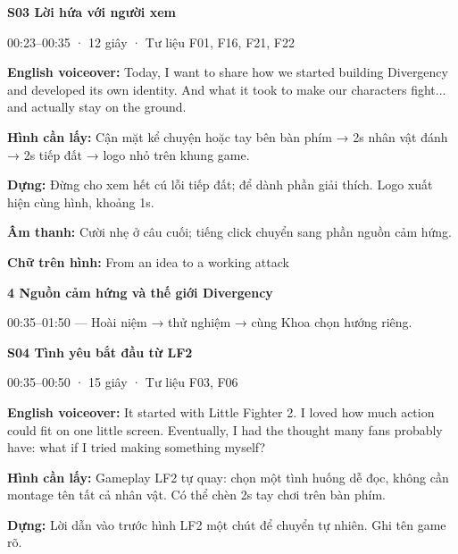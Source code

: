 \documentclass[10pt,a4paper]{article}
\begin{document}
\textbf{S03 Lời hứa với người xem}\par

00:23–00:35 · 12 giây · Tư liệu F01, F16, F21, F22\par

\textbf{English voiceover:}  Today, I want to share how we started building Divergency and developed its own identity. And what it took to make our characters fight... and actually stay on the ground.\par

\textbf{Hình cần lấy:}  Cận mặt kể chuyện hoặc tay bên bàn phím → 2s nhân vật đánh → 2s tiếp đất → logo nhỏ trên khung game.\par

\textbf{Dựng:}  Đừng cho xem hết cú lỗi tiếp đất; để dành phần giải thích. Logo xuất hiện cùng hình, khoảng 1s.\par

\textbf{Âm thanh:}  Cười nhẹ ở câu cuối; tiếng click chuyển sang phần nguồn cảm hứng.\par

\textbf{Chữ trên hình:}  From an idea to a working attack\par

\clearpage

\textbf{4 Nguồn cảm hứng và thế giới Divergency}\par

00:35–01:50 — Hoài niệm → thử nghiệm → cùng Khoa chọn hướng riêng.\par

\textbf{S04 Tình yêu bắt đầu từ LF2}\par

00:35–00:50 · 15 giây · Tư liệu F03, F06\par

\textbf{English voiceover:}  It started with Little Fighter 2. I loved how much action could fit on one little screen. Eventually, I had the thought many fans probably have: what if I tried making something myself?\par

\textbf{Hình cần lấy:}  Gameplay LF2 tự quay: chọn một tình huống dễ đọc, không cần montage tên tất cả nhân vật. Có thể chèn 2s tay chơi trên bàn phím.\par

\textbf{Dựng:}  Lời dẫn vào trước hình LF2 một chút để chuyển tự nhiên. Ghi tên game rõ.\par
\end{document}
